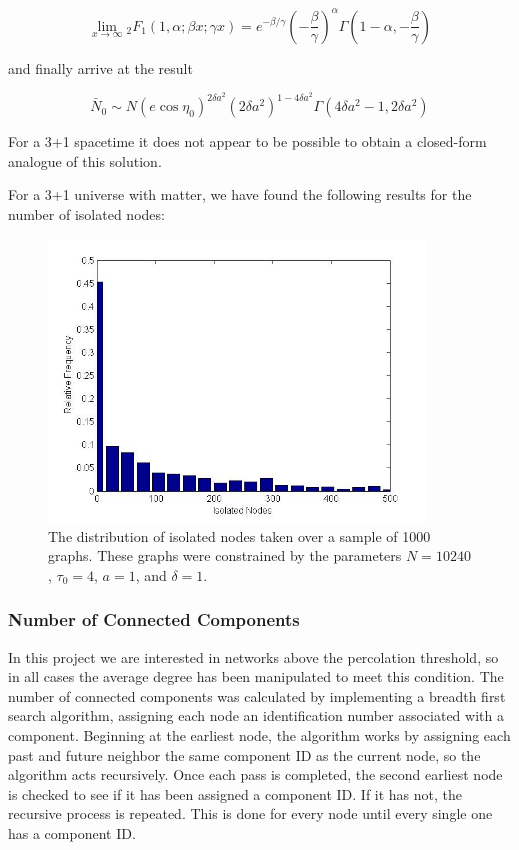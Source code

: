 \documentclass[preprint,notitlepage,amsmath,amssymb,floatfix]{revtex4-1}
\begin{document}
\begin{equation}
\lim_{x\to\infty} {}_2F_1\left(1,\alpha;\beta x;\gamma x\right) = e^{-\beta/\gamma}\left(-\frac{\beta}{\gamma}\right)^\alpha\Gamma\left(1-\alpha,-\frac{\beta}{\gamma}\right)
\end{equation}

\noindent and finally arrive at the result

\begin{equation}
\bar{N}_0 \sim N\left(e\cos\eta_0\right)^{2\delta a^2}\left(2\delta a^2\right)^{1-4\delta a^2}\Gamma\left(4\delta a^2-1,2\delta a^2\right)
\end{equation}

\noindent For a 3+1 spacetime it does not appear to be possible to obtain a closed-form analogue of this solution.  


\par For a 3+1 universe with matter, we have found the following results for the number of isolated nodes:

\begin{figure}
\includegraphics[width=10cm]{figures/Isolated_Nodes.jpg}
\caption{The distribution of isolated nodes taken over a sample of 1000 graphs.  These graphs were constrained by the parameters $N = 10240$, $\tau_0 = 4$, $a = 1$, and $\delta = 1$.}
\label{fig:iso_nodes_uni}
\centering
\end{figure}

\subsubsection{Number of Connected Components}
In this project we are interested in networks above the percolation threshold, so in all cases the average degree has been manipulated to meet this condition.  
The number of connected components was calculated by implementing a breadth first search algorithm, assigning each node an identification number associated with a component.
Beginning at the earliest node, the algorithm works by assigning each past and future neighbor the same component ID as the current node, so the algorithm acts recursively.  Once each pass is completed, the second earliest node is checked to see if it has been assigned a component ID.  If it has not, the recursive process is repeated.  This is done for every node until every single one has a component ID.
\end{document}
